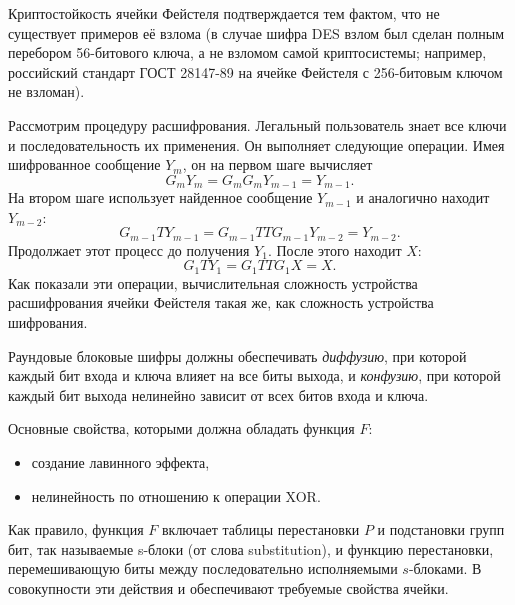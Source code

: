 Криптостойкость ячейки Фейстеля подтверждается тем фактом, что не существует примеров её взлома (в случае шифра DES взлом был сделан полным перебором 56-битового ключа, а не взломом самой криптосистемы; например, российский стандарт ГОСТ 28147-89 на ячейке Фейстеля с 256-битовым ключом не взломан).

Рассмотрим процедуру расшифрования. Легальный пользователь знает все ключи и последовательность их применения. Он выполняет следующие операции. Имея шифрованное сообщение $Y_{m}$, он на первом шаге вычисляет
\[
    G_{m} Y_{m} = G_{m} G_{m} Y_{m-1} = Y_{m-1}.
\]
На втором шаге использует найденное сообщение $Y_{m-1}$ и аналогично находит $Y_{m-2}$:
\[
    G_{m-1} T Y_{m-1} = G_{m-1} T T G_{m-1} Y_{m-2} = Y_{m-2}.
\]
Продолжает этот процесс до получения $Y_{1}$. После этого находит $X$:
\[
    G_{1} T Y_{1} = G_{1} T T G_{1} X = X.
\]
Как показали эти операции, вычислительная сложность устройства расшифрования ячейки Фейстеля такая же, как сложность устройства шифрования.

Раундовые блоковые шифры должны обеспечивать \emph{диффузию}, при которой каждый бит входа и ключа влияет на все биты выхода, и \emph{конфузию}, при которой каждый бит выхода нелинейно зависит от всех битов входа и ключа.

Основные свойства, которыми должна обладать функция $F$:
\begin{itemize}
    \item создание лавинного эффекта,
    \item нелинейность по отношению к операции XOR.
\end{itemize}

Как правило, функция $F$ включает таблицы перестановки $P$ и подстановки групп бит, так называемые s-блоки (от слова substitution), и функцию перестановки, перемешивающую биты между последовательно исполняемыми $s$-блоками. В совокупности эти действия и обеспечивают требуемые свойства ячейки.
